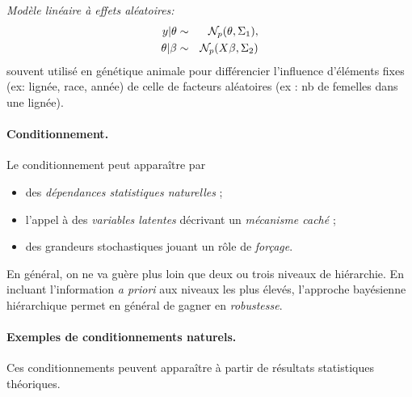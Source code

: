 \begin{exo}{\it Modèle linéaire à effets aléatoires:}
\begin{eqnarray*}
y|\theta & \sim & {\cal{N}}_p(\theta,\Sigma_1), \\
\theta|\beta & \sim & {\cal{N}}_p(X\beta,\Sigma_2)
\end{eqnarray*}
souvent utilisé en génétique animale pour différencier l'influence d'éléments fixes (ex: lignée, race, année) de celle de facteurs aléatoires (ex : nb de femelles dans une lignée).
\end{exo}

\paragraph{\bf Conditionnement.} Le conditionnement peut apparaître par 
\begin{itemize}
\item des \emph{dépendances statistiques naturelles} ; 
\item l'appel à des \emph{variables latentes} décrivant un \emph{mécanisme caché} ; 
\item des grandeurs stochastiques jouant un r\^ole de \emph{for\c cage}. 
\end{itemize}
En général, on ne va guère plus loin que deux ou trois niveaux de hiérarchie. En incluant l'information {\it a priori} aux niveaux les plus élevés, l'approche bayésienne hiérarchique permet en général de gagner en \emph{robustesse}. \\

\paragraph{\bf Exemples de conditionnements naturels.} Ces conditionnements peuvent apparaître à partir de résultats statistiques théoriques. \\


